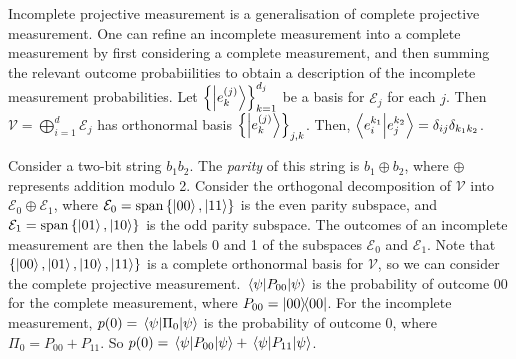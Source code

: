 Incomplete projective measurement is a generalisation of complete projective measurement.
One can refine an incomplete measurement into a complete measurement by first considering a complete measurement, and then summing the relevant outcome probabiilities to obtain a description of the incomplete measurement probabilities.
Let \( \qty{\ket{e_k^{(j)}}}_{k=1}^{d_j} \) be a basis for \( \mathcal E_j \) for each \( j \).
Then \( \mathcal V = \bigoplus_{i=1}^d \mathcal E_j \) has orthonormal basis \( \qty{\ket{e_k^{(j)}}}_{j,k} \).
Then, \( \ip{e_i^{k_1}}{e_j^{k_2}} = \delta_{ij} \delta_{k_1 k_2} \).

Consider a two-bit string \( b_1 b_2 \).
The \emph{parity} of this string is \( b_1 \oplus b_2 \), where \( \oplus \) represents addition modulo 2.
Consider the orthogonal decomposition of \( \mathcal V \) into \( \mathcal E_0 \oplus \mathcal E_1 \), where \( \mathcal E_0 = \operatorname{span} \qty{\ket{00}, \ket{11}} \) is the even parity subspace, and \( \mathcal E_1 = \operatorname{span} \qty{\ket{01}, \ket{10}} \) is the odd parity subspace.
The outcomes of an incomplete measurement are then the labels 0 and 1 of the subspaces \( \mathcal E_0 \) and \( \mathcal E_1 \).
Note that \( \qty{\ket{00}, \ket{01}, \ket{10}, \ket{11}} \) is a complete orthonormal basis for \( \mathcal V \), so we can consider the complete projective measurement.
\( \ev{P_{00}}{\psi} \) is the probability of outcome \( 00 \) for the complete measurement, where \( P_{00} = \op{00}{00} \).
For the incomplete measurement, \( p(0) = \ev{\Pi_0}{\psi} \) is the probability of outcome 0, where \( \Pi_0 = P_{00} + P_{11} \).
So \( p(0) = \ev{P_{00}}{\psi} + \ev{P_{11}}{\psi} \).

